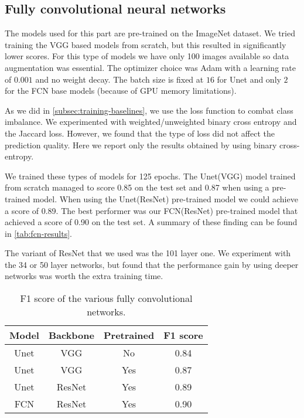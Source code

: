 \subsection{Fully convolutional neural networks} \label{subsec:training-fcn}
The models used for this part are pre-trained on the ImageNet dataset. We tried training the VGG based models from scratch, but this resulted in significantly lower scores. For this type of models we have only 100 images available so data augmentation was essential. The optimizer choice was Adam with a learning rate of $0.001$ and no weight decay. The batch size is fixed at $16$ for Unet and only $2$ for the FCN base models (because of GPU memory limitations).

As we did in \autoref{subsec:training-baselines}, we use the loss function to combat class imbalance. We experimented with weighted/unweighted binary cross entropy and the Jaccard loss. However, we found that the type of loss did not affect the prediction quality. Here we report only the results obtained by using binary cross-entropy.

We trained these types of models for 125 epochs. The Unet(VGG) model trained from scratch managed to score 0.85 on the test set and 0.87 when using a pre-trained model. When using the Unet(ResNet) pre-trained model we could achieve a score of 0.89. The best performer was our FCN(ResNet) pre-trained model that achieved a score of 0.90 on the test set. A summary of these finding can be found in \autoref{tab:fcn-results}.

The variant of ResNet that we used was the 101 layer one. We experiment with the 34 or 50 layer networks, but found that the performance gain by using deeper networks was worth the extra training time.

\begin{table}[h]
    \centering
    \begin{tabular}{|c|c|c|c|}
        \hline
        \textbf{Model} & \textbf{Backbone} & \textbf{Pretrained} & \textbf{F1 score} \\
        \hline
        \hline
        Unet & VGG & No & 0.84 \\
        \hline
        Unet & VGG & Yes & 0.87 \\
        \hline
        Unet & ResNet & Yes & 0.89 \\
        \hline
        FCN & ResNet & Yes & 0.90 \\
        \hline
    \end{tabular}
    \caption{F1 score of the various fully convolutional networks.}
    \label{tab:fcn-results}
\end{table}

